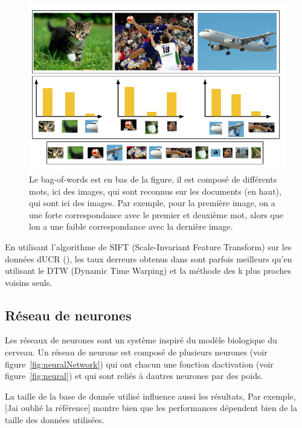 \documentclass[11pt]{sdm}
\begin{document}
			\begin{figure}[!ht]
				\centering
				\includegraphics[scale=0.6,natwidth=680,natheight=440]{figures/bagOfWords.png}
				\caption{Le bag-of-words est en bas de la figure, il est compos\'e de diff\'erents mots, ici des images, qui sont reconnus sur les documents (en haut), qui sont ici des images. Par exemple, pour la premi\`ere image, on a une forte correspondance avec le premier et deuxi\`eme mot, alors que l\textquotesingle on a une faible correspondance avec la derni\`ere image.}
				\label{fig:BoW}
			\end{figure}

			En utilisant l'algorithme de SIFT (Scale-Invariant Feature Transform) sur les donn\'ees d\textquotesingle UCR (\cite{UCRArchive}), les taux d\textquotesingle erreurs obtenus dans \cite{bailly2015bag} sont parfois meilleurs qu'en utilisant le DTW (Dynamic Time Warping) et la méthode des k plus proches voisins seuls.

	\subsection{R\'eseau de neurones}
		Les r\'eseaux de neurones sont un syst\`eme inspir\'e du mod\`ele biologique du cerveau. Un r\'eseau de neurone est compos\'e de plusieurs neurones (voir figure~\ref{fig:neuralNetwork}) qui ont chacun une fonction d\textquotesingle activation (voir figure~\ref{fig:neural}) et qui sont reli\'es \`a d\textquotesingle autres neurones par des poids.

		
		La taille de la base de donn\'ee utilis\'e influence aussi les r\'esultats, Par exemple, [J\textquotesingle ai oubli\'e la r\'ef\'erence] montre bien que les performances d\'ependent bien de la taille des donn\'ees utilis\'ees.
\end{document}
